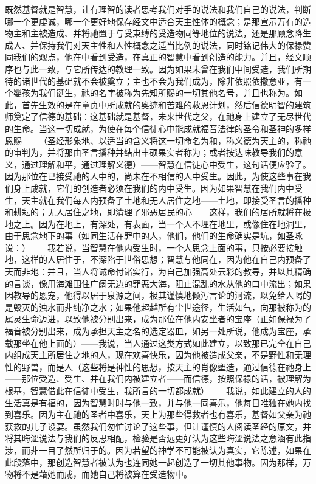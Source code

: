 既然基督就是智慧，让有理智的读者思考我们对手的说法和我们自己的说法，判断哪一个更虔诚，哪一个更好地保存经文中适合天主性体的概念；是那宣示万有的造物主和主被造成、并将祂置于与受束缚的受造物同等地位的说法，还是那顾念降生成人、并保持我们对天主性和人性概念之适当比例的说法，同时铭记伟大的保禄赞同我们的观点，他在中看到受造，在真正的智慧中看到创造的能力。并且，经文顺序也与此一致，与它所传达的教理一致。因为如果未曾在我们中间受造，我们所期待的诸世代的基础就不会被奠立；主也不会为我们成为，除非依照依撒意亚，有一个婴孩为我们诞生，祂的名字被称为先知所赐的一切其他名号，并且也称为。如此，首先生效的是在童贞中所成就的奥迹和苦难的救恩计划，然后信德明智的建筑师奠定了信德的基础：这基础就是基督，未来世代之父，在祂身上建立了无尽世代的生命。当这一切成就，为使在每个信徒心中能成就福音法律的圣令和圣神的多样恩赐——（圣经形象地、以适当的含义将这一切命名为和，称义德为天主的，称祂的审判为，并将那由圣言播种并结出丰硕果实者称为；或者按达味教导我们的意义，通过理解和平，通过理解义德）——智慧在信徒心中受生，这句话便应验了。因为那位在已接受祂的人中的，尚未在不相信的人中受生。因此，为使这些事在我们身上成就，它们的创造者必须在我们的内中受生。因为如果智慧在我们内中受生，天主就在我们每人内预备了土地和无人居住之地——土地，即接受圣言的播种和耕耘的；无人居住之地，即清理了邪恶居民的心——这样，我们的居所就将在极地之上。因为在地上，有深处，有表面，当一个人不埋在地里，或像住在地洞里，由于思念地下的事（如同生活在罪中的人，他们，他们的生命确实是坑，如圣咏说：）——我若说，当智慧在他内受生时，一个人思念上面的事，只按必要接触地，这样的人居住于，不深陷于世俗思想；智慧与他同在，因为他在自己内预备了天而非地：并且，当人将诫命付诸实行，为自己加强高处云彩的教导，并以其精确的言谈，像用海滩围住广阔无边的罪恶大海，阻止混乱的水从他的口中流出；如果因教导的恩宠，他得以居于泉源之间，极其谨慎地倾泻言论的河流，以免给人喝的是毁灭的浊水而非纯净之水；如果他超越所有尘世途径，生活如气，向那被称为的属灵生命迈进，以致他被分别出来，成为那位在他内安坐者的宝座（正如保禄为了福音被分别出来，成为承担天主之名的选定器皿，如另一处所说，他成为宝座，承载那坐在他上面的）——我说，当人通过这类方式如此建立，以致那已完全在自己内组成天主所居住之地的人，现在欢喜快乐，因为他被造成父亲，不是野性和无理性的野兽，而是人（这些将是神性的思想，按天主的肖像塑造，通过信德在祂身上——那位受造、受生、并在我们内被建立者——而信德，按照保禄的话，被理解为根基，智慧借此在信徒中受生，我所言的一切都成就）——我说，如此建立的人的生活真是有福的，因为智慧时时与他一致，并与他一同喜乐，他每日唯独在她内找到喜乐。因为主在祂的圣者中喜乐，天上为那些得救者也有喜乐，基督如父亲为祂获救的儿子设宴。虽然我们匆忙讨论了这些事，但让谨慎的人阅读圣经的原文，并将其晦涩说法与我们的反思相配，检验是否远更好认为这些晦涩说法之意涵有此指涉，而非一目了然所归于的。因为若望的神学不可能被认为真实，它陈述，如果在此段落中，那创造智慧者被认为也连同她一起创造了一切其他事物。因为那样，万物将不是藉她而成，而她自己将被算在受造物中。\par

